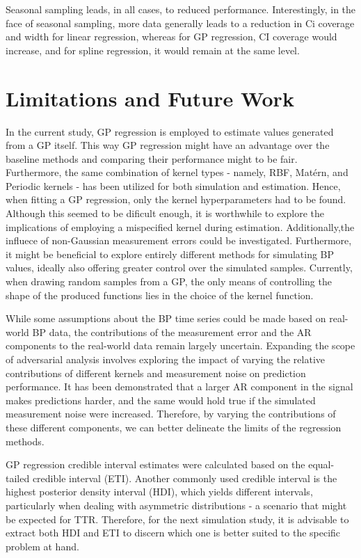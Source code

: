 Seasonal sampling leads, in all cases, to reduced performance.
Interestingly, in the face of seasonal sampling, more data generally leads to
a reduction in Ci coverage and width for linear regression,
whereas for GP regression, CI coverage would increase,
and for spline regression, it would remain at the same level.



\section{Limitations and Future Work}

In the current study, GP regression is employed to estimate values generated
from a GP itself. This way GP regression might have an advantage over the baseline methods and
comparing their performance might to be fair.
Furthermore, the same combination of kernel types
- namely, RBF, Matérn, and Periodic kernels - has been utilized for both
simulation and estimation.
Hence, when fitting a GP regression, only the kernel hyperparameters had to be found.
Although this seemed to be dificult enough, it is worthwhile to explore the
implications of employing a mispecified kernel during estimation.
Additionally,the influece of non-Gaussian measurement errors  could be investigated.
Furthermore, it might be beneficial to explore entirely different methods for
simulating BP values, ideally also offering greater control over the simulated samples.
Currently, when drawing random samples from a GP,
the only means of controlling the shape of the produced functions
lies in the choice of the kernel function.

While some assumptions about the BP time series could be made based
on real-world BP data, the contributions of the measurement
error and the AR components to the real-world data remain largely uncertain.
Expanding the scope of adversarial analysis involves exploring the impact of
varying the relative contributions of different kernels and measurement noise
on prediction performance. It has been demonstrated that a larger AR
component in the signal makes predictions harder, and the same would hold true
if the simulated measurement noise were increased.
Therefore, by varying the contributions of these different components,
we can better delineate the limits of the regression methods.

GP regression credible interval estimates were calculated
based on the equal-tailed credible interval (ETI).
Another commonly used credible interval is the highest posterior density interval (HDI),
which yields different intervals, particularly when dealing with asymmetric distributions
- a scenario that might be expected for TTR.
Therefore, for the next simulation study, it is advisable to extract both HDI and ETI to
discern which one is better suited to the specific problem at hand.

